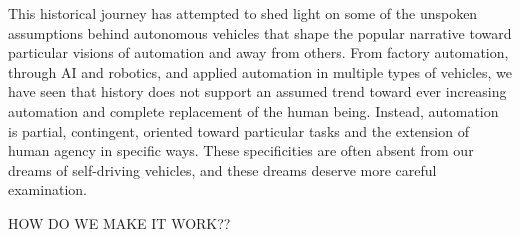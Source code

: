 
This historical journey has attempted
to shed light on some of the unspoken assumptions behind autonomous
vehicles that shape the popular narrative toward
particular visions of automation and away from others. From factory
automation, through AI and robotics, and applied automation in
multiple types of vehicles, we have seen that history does not support
an assumed trend toward ever increasing automation and complete
replacement of the human being. Instead, automation is partial,
contingent, oriented toward particular tasks and the extension of
human agency in specific ways. These specificities are often absent
from our dreams of self-driving vehicles, and these dreams deserve
more careful examination.

HOW DO WE MAKE IT WORK??




